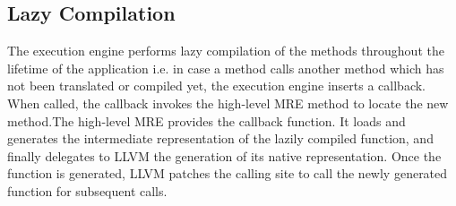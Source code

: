 \subsection{Lazy Compilation}
The execution engine performs lazy compilation of the methods throughout the lifetime of the application i.e. in case a method calls another method which has not been translated or compiled yet, the execution engine inserts a callback. When called, the callback invokes the high-level MRE method to locate the new method.The high-level MRE provides the callback function. It loads and generates the intermediate representation of the lazily compiled function, and finally delegates to LLVM the generation of its native representation. Once the function is generated, LLVM patches the calling site to call the newly generated function for subsequent calls.